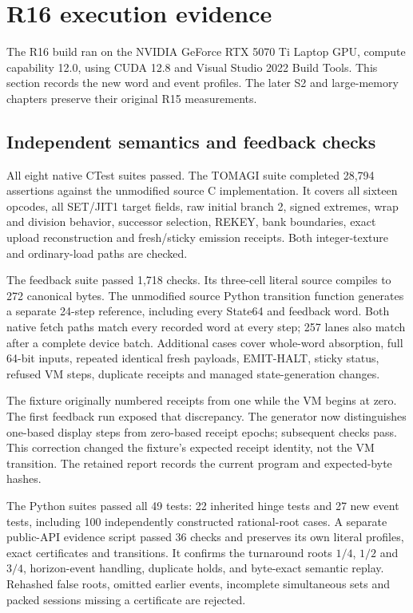 \section{R16 execution evidence}
\label{sec:r16-evidence}
The R16 build ran on the NVIDIA GeForce RTX 5070 Ti Laptop GPU, compute
capability 12.0, using CUDA 12.8 and Visual Studio 2022 Build Tools. This
section records the new word and event profiles. The later S2 and large-memory
chapters preserve their original R15 measurements.

\subsection{Independent semantics and feedback checks}
All eight native CTest suites passed. The TOMAGI suite completed 28,794
assertions against the unmodified source C implementation. It covers all
sixteen opcodes, all SET/JIT1 target fields, raw initial branch 2, signed
extremes, wrap and division behavior, successor selection, REKEY, bank
boundaries, exact upload reconstruction and fresh/sticky emission receipts.
Both integer-texture and ordinary-load paths are checked.

The feedback suite passed 1,718 checks. Its three-cell literal source compiles
to 272 canonical bytes. The unmodified source Python transition function
generates a separate 24-step reference, including every State64 and feedback
word. Both native fetch paths match every recorded word at every step;
257 lanes also match after a complete device batch. Additional cases cover
whole-word absorption, full 64-bit inputs, repeated identical fresh payloads,
EMIT-HALT, sticky status, refused VM steps, duplicate receipts and managed
state-generation changes.

The fixture originally numbered receipts from one while the VM begins at zero.
The first feedback run exposed that discrepancy. The generator now distinguishes
one-based display steps from zero-based receipt epochs; subsequent checks pass.
This correction changed the fixture's expected receipt identity, not the VM
transition. The retained report records the current program and expected-byte
hashes.

The Python suites passed all 49 tests: 22 inherited hinge tests and 27 new
event tests, including 100 independently constructed rational-root cases.
A separate public-API evidence script passed 36 checks and preserves its own
literal profiles, exact certificates and transitions. It confirms the
turnaround roots $1/4$, $1/2$ and $3/4$, horizon-event handling, duplicate
holds, and byte-exact semantic replay. Rehashed false roots, omitted earlier
events, incomplete simultaneous sets and packed sessions missing a certificate
are rejected.

